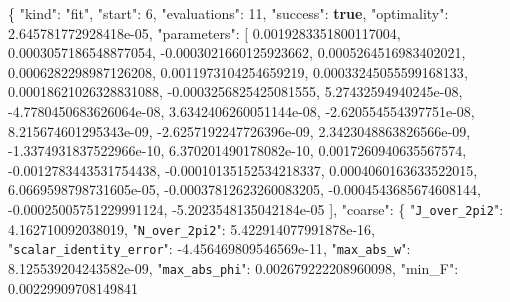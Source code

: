 \documentclass[
  10pt,
]{article}
\newenvironment{Shaded}{}{}
\newcommand{\DataTypeTok}[1]{\textcolor[rgb]{0.56,0.13,0.00}{#1}}
\newcommand{\DecValTok}[1]{\textcolor[rgb]{0.25,0.63,0.44}{#1}}
\newcommand{\FloatTok}[1]{\textcolor[rgb]{0.25,0.63,0.44}{#1}}
\newcommand{\FunctionTok}[1]{\textcolor[rgb]{0.02,0.16,0.49}{#1}}
\newcommand{\KeywordTok}[1]{\textcolor[rgb]{0.00,0.44,0.13}{\textbf{#1}}}
\newcommand{\OtherTok}[1]{\textcolor[rgb]{0.00,0.44,0.13}{#1}}
\newcommand{\StringTok}[1]{\textcolor[rgb]{0.25,0.44,0.63}{#1}}
\begin{document}
\begin{Shaded}
\begin{Highlighting}[]
\FunctionTok{\{}
  \DataTypeTok{"kind"}\FunctionTok{:} \StringTok{"fit"}\FunctionTok{,}
  \DataTypeTok{"start"}\FunctionTok{:} \DecValTok{6}\FunctionTok{,}
  \DataTypeTok{"evaluations"}\FunctionTok{:} \DecValTok{11}\FunctionTok{,}
  \DataTypeTok{"success"}\FunctionTok{:} \KeywordTok{true}\FunctionTok{,}
  \DataTypeTok{"optimality"}\FunctionTok{:} \FloatTok{2.645781772928418e{-}05}\FunctionTok{,}
  \DataTypeTok{"parameters"}\FunctionTok{:} \OtherTok{[}
    \FloatTok{0.0019283351800117004}\OtherTok{,}
    \FloatTok{0.0003057186548877054}\OtherTok{,}
    \FloatTok{{-}0.0003021660125923662}\OtherTok{,}
    \FloatTok{0.0005264516983402021}\OtherTok{,}
    \FloatTok{0.0006282298987126208}\OtherTok{,}
    \FloatTok{0.0011973104254659219}\OtherTok{,}
    \FloatTok{0.00033245055599168133}\OtherTok{,}
    \FloatTok{0.00018621026328831088}\OtherTok{,}
    \FloatTok{{-}0.0003256825425081555}\OtherTok{,}
    \FloatTok{5.27432594940245e{-}08}\OtherTok{,}
    \FloatTok{{-}4.7780450683626064e{-}08}\OtherTok{,}
    \FloatTok{3.6342406260051144e{-}08}\OtherTok{,}
    \FloatTok{{-}2.620554554397751e{-}08}\OtherTok{,}
    \FloatTok{8.215674601295343e{-}09}\OtherTok{,}
    \FloatTok{{-}2.6257192247726396e{-}09}\OtherTok{,}
    \FloatTok{2.3423048863826566e{-}09}\OtherTok{,}
    \FloatTok{{-}1.3374931837522966e{-}10}\OtherTok{,}
    \FloatTok{6.370201490178082e{-}10}\OtherTok{,}
    \FloatTok{0.0017260940635567574}\OtherTok{,}
    \FloatTok{{-}0.0012783443531754438}\OtherTok{,}
    \FloatTok{{-}0.00010135152534218337}\OtherTok{,}
    \FloatTok{0.0004060163633522015}\OtherTok{,}
    \FloatTok{6.0669598798731605e{-}05}\OtherTok{,}
    \FloatTok{{-}0.00037812623260083205}\OtherTok{,}
    \FloatTok{{-}0.0004543685674608144}\OtherTok{,}
    \FloatTok{{-}0.00025005751229991124}\OtherTok{,}
    \FloatTok{{-}5.2023548135042184e{-}05}
  \OtherTok{]}\FunctionTok{,}
  \DataTypeTok{"coarse"}\FunctionTok{:} \FunctionTok{\{}
    \DataTypeTok{"\nolinkurl{J_over_2pi2}"}\FunctionTok{:} \FloatTok{4.162710092038019}\FunctionTok{,}
    \DataTypeTok{"\nolinkurl{N_over_2pi2}"}\FunctionTok{:} \FloatTok{5.422914077991878e{-}16}\FunctionTok{,}
    \DataTypeTok{"\nolinkurl{scalar_identity_error}"}\FunctionTok{:} \FloatTok{{-}4.456469809546569e{-}11}\FunctionTok{,}
    \DataTypeTok{"\nolinkurl{max_abs_w}"}\FunctionTok{:} \FloatTok{8.125539204243582e{-}09}\FunctionTok{,}
    \DataTypeTok{"\nolinkurl{max_abs_phi}"}\FunctionTok{:} \FloatTok{0.002679222208960098}\FunctionTok{,}
    \DataTypeTok{"min\_F"}\FunctionTok{:} \FloatTok{0.00229909708149841}

\end{Highlighting}
\end{Shaded}
\end{document}
